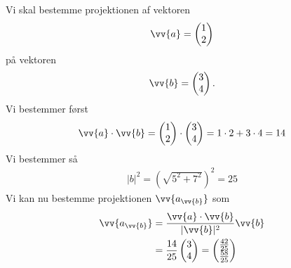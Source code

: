 \begin{exa}
Vi skal bestemme projektionen af vektoren 
\begin{align*}
\vv{a} = \begin{pmatrix}
1 \\ 2
\end{pmatrix}
\end{align*}
på vektoren 
\begin{align*}
\vv{b} = \begin{pmatrix}
3 \\ 4
\end{pmatrix}.
\end{align*}
Vi bestemmer først
\begin{align*}
\vv{a} \cdot \vv{b} = \begin{pmatrix}
1 \\ 2
\end{pmatrix}
\cdot \begin{pmatrix}
3 \\ 4
\end{pmatrix}
= 1\cdot 2 + 3\cdot 4 = 14
\end{align*}
Vi bestemmer så
\begin{align*}
|b|^2 = (\sqrt{5^2+7^2})^2 = 25
\end{align*}
Vi kan nu bestemme projektionen $\vv{a_{\vv{b}}}$ som
\begin{align*}
\vv{a_{\vv{b}}} &= \frac{\vv{a}\cdot \vv{b}}{|\vv{b}|^2}\vv{b} \\&= \frac{14}{25}\begin{pmatrix}
3 \\ 4
\end{pmatrix} = \begin{pmatrix}
\frac{42}{25} \\ \frac{58}{25}
\end{pmatrix}
\end{align*}
\end{exa}

